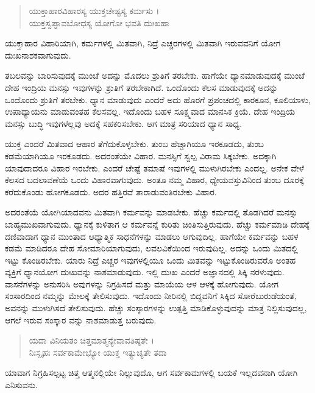 \begin{verse}
ಯುಕ್ತಾಹಾರವಿಹಾರಸ್ಯ ಯುಕ್ತಚೇಷ್ಟಸ್ಯ ಕರ್ಮಸು ।\\ಯುಕ್ತಸ್ವಪ್ನಾವಬೋಧಸ್ಯ ಯೋಗೋ ಭವತಿ ದುಃಖಹಾ 
\end{verse}

{\small ಯುಕ್ತಾಹಾರ ವಿಹಾರಿಯಾಗಿ, ಕರ್ಮಗಳಲ್ಲಿ ಮಿತವಾಗಿ, ನಿದ್ರೆ ಎಚ್ಚರಗಳಲ್ಲಿ ಮಿತವಾಗಿ ಇರುವವನಿಗೆ ಯೋಗ ದುಃಖನಾಶಕವಾಗುವುದು.}

ತಬಲವನ್ನು ಬಾರಿಸುವುದಕ್ಕೆ ಮುಂಚೆ ಅದನ್ನು ಮೊದಲು ಶ್ರುತಿಗೆ ತರಬೇಕು. ಹಾಗೆಯೇ ಧ್ಯಾನಮಾಡುವುದಕ್ಕೆ ಮುಂಚೆ ದೇಹ ಇಂದ್ರಿಯ ಮನಸ್ಸು ಇವುಗಳನ್ನು ಶ್ರುತಿಗೆ ತರಬೇಕಾಗಿದೆ. ಒಂದೊಂದು ಕೆಲಸ ಮಾಡುವುದಕ್ಕೆ ಅದನ್ನು ಒಂದೊಂದು ಶ್ರುತಿಗೆ ತರಬೇಕು. ಧ್ಯಾನ ಮಾಡುವುದು ಎಂದರೆ ಅದು ಹೊರಗೆ ಪ್ರಪಂಚದಲ್ಲಿ ಕಾರಕೂನ, ಕೂಲಿಯಾಳು, ಉಪಾಧ್ಯಾಯನು ಮಾಡುವಂತಹ ಕೆಲಸವಲ್ಲ. ಇದೊಂದು ಬಹಳ ಸೂಕ್ಷ್ಮವಾದ ಮಾನಸಿಕ ಕ್ರಿಯೆ. ದೇಹ ಇಂದ್ರಿಯ ಮನಸ್ಸು ಬುದ್ಧಿ ಇವುಗಳೆಲ್ಲವು ಅದಕ್ಕೆ ಸಹಕರಿಸಬೇಕು. ಆಗ ಮಾತ್ರ ಸರಿಯಾದ ಧ್ಯಾನ ಸಾಧ್ಯ.

ಯುಕ್ತ ಎಂದರೆ ಮಿತವಾದ ಆಹಾರ ತೆಗೆದುಕೊಳ್ಳಬೇಕು. ತುಂಬ ಹೆಚ್ಚಾಗಿಯೂ ಇರಕೂಡದು, ತುಂಬ ಕಡಮೆಯಾಗಿಯೂ ಇರಕೂಡದು. ಅದರಂತೆಯೇ ವಿಹಾರ. ಮನಸ್ಸಿಗೆ ಸ್ವಲ್ಪ ವಿರಾಮ ಸಿಕ್ಕಬೇಕು. ಅದಕ್ಕಾಗಿ ಯಾವುದಾದರೂ ವಿಹಾರ ಇರಬೇಕು. ಎಂದರೆ ಚೇಷ್ಟೆ ತಮಾಷೆ ಇವುಗಳಲ್ಲಿ ಮುಳುಗಿರಬೇಕು ಎಂದಲ್ಲ. ಅನೇಕ ವೇಳೆ ಕೆಲಸದ ಬದಲಾವಣೆಯೆ ಒಂದು ವಿಹಾರವಾಗುವುದು. ಅಂತೂ ನಮ್ಮ ವಿಹಾರ, ಧ್ಯೇಯವಸ್ತುವಿನಿಂದ ತುಂಬ ದೂರಕ್ಕೆ ಕರೆದುಕೊಂಡು ಹೋಗಕೂಡದು. ಅದರ ಹತ್ತಿರವೆ ತಾರಾಡುವಂತಿರಬೇಕು ವಿಹಾರ.

ಅದರಂತೆಯೆ ಯೋಗಿಯಾದವನು ಮಿತವಾಗಿ ಕರ್ಮವನ್ನು ಮಾಡಬೇಕು. ಹೆಚ್ಚು ಕರ್ಮದಲ್ಲಿ ತೊಡಗಿದರೆ ಮನಸ್ಸು ಬಾಹ್ಯಮುಖವಾಗುವುದು. ಧ್ಯಾನಕ್ಕೆ ಕುಳಿತಾಗ ಆ ಕರ್ಮವನ್ನೆ ಕುರಿತು ಚಿಂತಿಸುತ್ತಿರುವುದು. ಹೆಚ್ಚು ಕರ್ಮಮಾಡಿ ದೇಹಕ್ಕೆ ದಣಿವಾದಾಗ ಧ್ಯಾನ ಮುಂತಾದ ಆಧ್ಯಾತ್ಮಿಕ ಸಾಧನೆಗಳನ್ನು ಮಾಡಲು ಆಗುವುದಿಲ್ಲ. ಹಾಗೆಯೇ ಕರ್ಮವನ್ನು ಬಹಳ ಕಡಮೆ ಮಾಡಿದರೂ ದೇಹ ಸೋಮಾರಿಯಾಗುವುದು, ಲವಲವಿಕೆಯಿಂದ ಇರುವುದಿಲ್ಲ. ಅದನ್ನು ಒಂದು ಮಿತದಲ್ಲಿ ಇಟ್ಟು ಕೊಂಡಿರಬೇಕು. ಯಾರು ನಿದ್ರೆ ಎಚ್ಚರ ಇವುಗಳಲ್ಲಿಯೂ ಒಂದು ಮಿತವನ್ನು ಇಟ್ಟುಕೊಂಡಿರುವರೊ ಅಂತಹ ವ್ಯಕ್ತಿಗೆ ಧ್ಯಾನಯೋಗ ದುಃಖವನ್ನು ನಾಶಮಾಡುವುದು. ಇಲ್ಲಿ ದುಃಖ ಎಂದರೆ ಅಜ್ಞಾನದಲ್ಲಿ ಸಿಕ್ಕಿ ನರಳುವುದು. ವಾಸನೆಗಳನ್ನು ಅನುಸರಿಸಿ ಅವುಗಳನ್ನು ನಿಗ್ರಹಿಸದೆ ಮತ್ತು ಮಾಯೆಯ ಆಳ ಆಳಕ್ಕೆ ಹೋಗುವುದು. ಯೋಗ ಸಂಸಾರದಿಂದ ನಮ್ಮನ್ನು ಮೇಲಕ್ಕೆ ತೇಲಿಸುವುದು. ಇದೊಂದು ನೀರಿನಲ್ಲಿ ಬಿದ್ದವನಿಗೆ ಸಿಕ್ಕಿದ ಸೋರೆಬುರುಡೆಯಂತೆ, ಅವನನ್ನು ಮುಳುಗಿಸದೆ ತೇಲಿಸುವುದು. ಹೆಚ್ಚು ಸಂಸ್ಕಾರಗಳನ್ನು ಉತ್ಪತ್ತಿ ಮಾಡಿಕೊಳ್ಳುವುದನ್ನು ಮಾತ್ರ ನಿಲ್ಲಿಸುವುದಲ್ಲ, ಆಗಲೆ ಇರುವ ಸಂಸ್ಕಾರ ವನ್ನು ನಾಶಮಾಡುತ್ತ ಬರುವುದು.

\begin{verse}
ಯದಾ ವಿನಿಯತಂ ಚಿತ್ತಮಾತ್ಮನ್ಯೇವಾವತಿಷ್ಠತೇ ।\\ನಿಃಸ್ಪೃಹಃ ಸರ್ವಕಾಮೇಭ್ಯೋ ಯುಕ್ತ ಇತ್ಯುಚ್ಯತೇ ತದಾ 
\end{verse}

{\small ಯಾವಾಗ ನಿಗ್ರಹಿಸಲ್ಪಟ್ಟ ಚಿತ್ತ ಆತ್ಮನಲ್ಲಿಯೇ ನಿಲ್ಲುವುದೊ, ಆಗ ಸರ್ವಕಾಮಗಳಲ್ಲಿ ಬಯಕೆ ಇಲ್ಲದವನಾಗಿ ಯೋಗಿ ಎನಿಸುವನು.}

